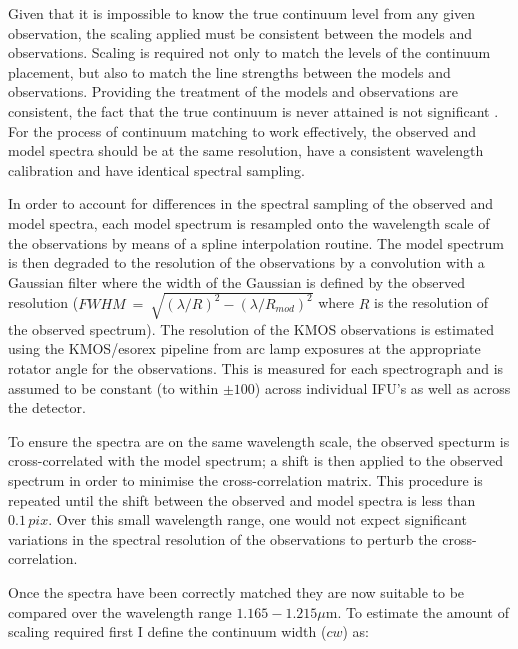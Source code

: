 Given that it is impossible to know the true continuum level from any given observation,
the scaling applied must be consistent between the models and observations.
Scaling is required not only to match the levels of the continuum placement, but also to match the line strengths between the models and observations.
Providing the treatment of the models and observations are consistent, the fact that the true continuum is never attained is not significant
\citep{2014ApJ...788...58G}.
For the process of continuum matching to work effectively,
the observed and model spectra should be at the same resolution,
have a consistent wavelength calibration
and have identical spectral sampling.

In order to account for differences in the spectral sampling of the observed and model spectra,
each model spectrum is resampled onto the wavelength scale of the observations by means of a spline interpolation routine.
The model spectrum is then degraded to the resolution of the observations by a
convolution with a Gaussian filter where the width of the Gaussian is defined by the observed resolution ($FWHM~=~\sqrt{(\lambda/R)^{2} -(\lambda/R_{mod})^{2}}$ where $R$ is the resolution of the observed spectrum).
The resolution of the KMOS observations is estimated using the KMOS/esorex pipeline from arc lamp exposures at the appropriate rotator angle for the observations.
This is measured for each spectrograph and is assumed to be constant (to within $\pm 100$) across individual IFU's as well as across the detector.

To ensure the spectra are on the same wavelength scale, the observed specturm is cross-correlated with the model spectrum;
a shift is then applied to the observed spectrum in order to minimise the cross-correlation matrix.
This procedure is repeated until the shift between the observed and model spectra is less than $0.1\,pix$.
Over this small wavelength range, one would not expect significant variations in the spectral resolution of the observations to perturb the cross-correlation.

Once the spectra have been correctly matched they are now suitable to be compared over the wavelength range $1.165-1.215\mu$m.
To estimate the amount of scaling required first I define the continuum width ($cw$) as:

